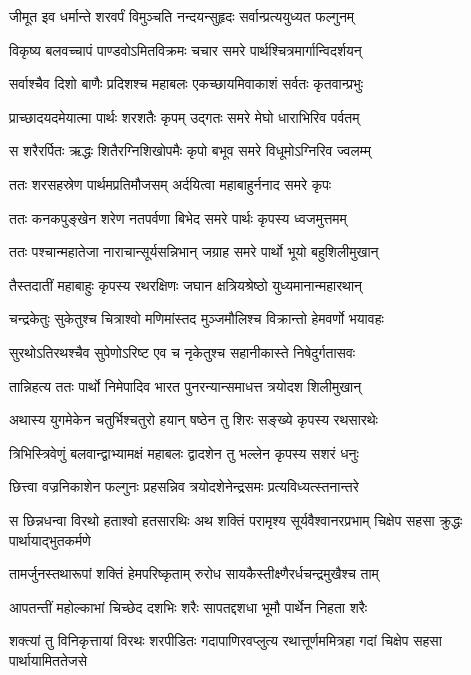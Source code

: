 \twolineshloka
{जीमूत इव धर्मान्ते शरवर्पं विमुञ्चति}
{नन्दयन्सुहृदः सर्वान्प्रत्ययुध्यत फल्गुनम्}


\twolineshloka
{विकृष्य बलवच्चापं पाण्डवोऽमितविक्रमः}
{चचार समरे पार्थश्चित्रमार्गान्विदर्शयन्}


\twolineshloka
{सर्वाश्चैव दिशो बाणैः प्रदिशश्च महाबलः}
{एकच्छायमिवाकाशं सर्वतः कृतवान्प्रभुः}


\twolineshloka
{प्राच्छादयदमेयात्मा पार्थः शरशतैः कृपम्}
{उद्गतः समरे मेघो धाराभिरिव पर्वतम्}


\twolineshloka
{स शरैरर्पितः ऋद्धः शितैरग्निशिखोपमैः}
{कृपो बभूव समरे विधूमोऽग्निरिव ज्वलम्म्}


\twolineshloka
{ततः शरसहस्रेण पार्थमप्रतिमौजसम्}
{अर्दयित्वा महाबाहुर्ननाद समरे कृपः}


\twolineshloka
{ततः कनकपुङ्खेन शरेण नतपर्वणा}
{बिभेद समरे पार्थः कृपस्य ध्वजमुत्तमम्}


\twolineshloka
{ततः पश्चान्महातेजा नाराचान्सूर्यसन्निभान्}
{जग्राह समरे पार्थो भूयो बहुशिलीमुखान्}


\twolineshloka
{तैस्तदातीं महाबाहुः कृपस्य रथरक्षिणः}
{जघान क्षत्रियश्रेष्ठो युध्यमानान्महारथान्}


\twolineshloka
{चन्द्रकेतुः सुकेतुश्च चित्राश्वो मणिमांस्तद}
{मुञ्जमौलिश्च विक्रान्तो हेमवर्णो भयावहः}


\twolineshloka
{सुरथोऽतिरथश्चैव सुपेणोऽरिष्ट एव च}
{नृकेतुश्च सहानीकास्ते निषेदुर्गतासवः}


\twolineshloka
{तान्निहत्य ततः पार्थो निमेपादिव भारत}
{पुनरन्यान्समाधत्त त्रयोदश शिलीमुखान्}


\twolineshloka
{अथास्य युगमेकेन चतुर्भिश्चतुरो हयान्}
{षष्ठेन तु शिरः सङ्ख्ये कृपस्य रथसारथेः}


\twolineshloka
{त्रिभिस्त्रिवेणुं बलवान्द्वाभ्यामक्षं महाबलः}
{द्वादशेन तु भल्लेन कृपस्य सशरं धनुः}


\twolineshloka
{छित्त्वा वज्रनिकाशेन फल्गुनः प्रहसन्निव}
{त्रयोदशेनेन्द्रसमः प्रत्यविध्यत्स्तनान्तरे}


\threelineshloka
{स छिन्नधन्वा विरथो हताश्वो हतसारथिः}
{अथ शक्तिं परामृश्य सूर्यवैश्वानरप्रभाम्}
{चिक्षेप सहसा क्रुद्धः पार्थायाद्भुतकर्मणे}


\twolineshloka
{तामर्जुनस्तथारूपां शक्तिं हेमपरिष्कृताम्}
{रुरोध सायकैस्तीक्ष्णैरर्धचन्द्रमुखैश्च ताम्}


\twolineshloka
{आपतन्तीं महोल्काभां चिच्छेद दशभिः शरैः}
{सापतद्दशधा भूमौ पार्थेन निहता शरैः}


\threelineshloka
{शक्त्यां तु विनिकृत्तायां विरथः शरपीडितः}
{गदापाणिरवप्लुत्य रथात्तूर्णममित्रहा}
{गदां चिक्षेप सहसा पार्थायामिततेजसे}


